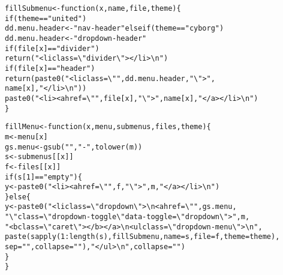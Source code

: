 \documentclass{article}\usepackage[]{graphicx}\usepackage[]{color}
\makeatletter
\newcommand{\hlnum}[1]{\textcolor[rgb]{0.863,0.196,0.184}{#1}}%
\newcommand{\hlstr}[1]{\textcolor[rgb]{0.863,0.196,0.184}{#1}}%
\newcommand{\hlopt}[1]{\textcolor[rgb]{0.576,0.631,0.631}{#1}}%
\newcommand{\hlstd}[1]{\textcolor[rgb]{0.514,0.58,0.588}{#1}}%
\newcommand{\hlkwa}[1]{\textcolor[rgb]{0.796,0.294,0.086}{#1}}%
\newcommand{\hlkwb}[1]{\textcolor[rgb]{0.522,0.6,0}{#1}}%
\newcommand{\hlkwc}[1]{\textcolor[rgb]{0.796,0.294,0.086}{#1}}%
\newcommand{\hlkwd}[1]{\textcolor[rgb]{0.576,0.631,0.631}{#1}}%
\newenvironment{kframe}{%
 \def\at@end@of@kframe{}%
 \ifinner\ifhmode%
  \def\at@end@of@kframe{\end{minipage}}%
  \begin{minipage}{\columnwidth}%
 \fi\fi%
 \def\FrameCommand##1{\hskip\@totalleftmargin \hskip-\fboxsep
 \colorbox{shadecolor}{##1}\hskip-\fboxsep
     \hskip-\linewidth \hskip-\@totalleftmargin \hskip\columnwidth}%
 \MakeFramed {\advance\hsize-\width
   \@totalleftmargin\z@ \linewidth\hsize
   \@setminipage}}%
 {\par\unskip\endMakeFramed%
 \at@end@of@kframe}
\newenvironment{knitrout}{}{} %
\makeatother
\begin{document}
\begin{knitrout}
\begin{kframe}
\begin{alltt}
    \hlstd{fillSubmenu} \hlkwb{<-} \hlkwa{function}\hlstd{(}\hlkwc{x}\hlstd{,} \hlkwc{name}\hlstd{,} \hlkwc{file}\hlstd{,} \hlkwc{theme}\hlstd{) \{}
        \hlkwa{if} \hlstd{(theme} \hlopt{==} \hlstr{"united"}\hlstd{)}
            \hlstd{dd.menu.header} \hlkwb{<-} \hlstr{"nav-header"} \hlkwa{else if} \hlstd{(theme} \hlopt{==} \hlstr{"cyborg"}\hlstd{)}
            \hlstd{dd.menu.header} \hlkwb{<-} \hlstr{"dropdown-header"}
        \hlkwa{if} \hlstd{(file[x]} \hlopt{==} \hlstr{"divider"}\hlstd{)}
            \hlkwd{return}\hlstd{(}\hlstr{"              <li class=\textbackslash{}"divider\textbackslash{}"></li>\textbackslash{}n"}\hlstd{)}
        \hlkwa{if} \hlstd{(file[x]} \hlopt{==} \hlstr{"header"}\hlstd{)}
            \hlkwd{return}\hlstd{(}\hlkwd{paste0}\hlstd{(}\hlstr{"              <li class=\textbackslash{}""}\hlstd{, dd.menu.header,} \hlstr{"\textbackslash{}">"}\hlstd{,}
                \hlstd{name[x],} \hlstr{"</li>\textbackslash{}n"}\hlstd{))}
        \hlkwd{paste0}\hlstd{(}\hlstr{"              <li><a href=\textbackslash{}""}\hlstd{, file[x],} \hlstr{"\textbackslash{}">"}\hlstd{, name[x],} \hlstr{"</a></li>\textbackslash{}n"}\hlstd{)}
    \hlstd{\}}

    \hlstd{fillMenu} \hlkwb{<-} \hlkwa{function}\hlstd{(}\hlkwc{x}\hlstd{,} \hlkwc{menu}\hlstd{,} \hlkwc{submenus}\hlstd{,} \hlkwc{files}\hlstd{,} \hlkwc{theme}\hlstd{) \{}
        \hlstd{m} \hlkwb{<-} \hlstd{menu[x]}
        \hlstd{gs.menu} \hlkwb{<-} \hlkwd{gsub}\hlstd{(}\hlstr{" "}\hlstd{,} \hlstr{"-"}\hlstd{,} \hlkwd{tolower}\hlstd{(m))}
        \hlstd{s} \hlkwb{<-} \hlstd{submenus[[x]]}
        \hlstd{f} \hlkwb{<-} \hlstd{files[[x]]}
        \hlkwa{if} \hlstd{(s[}\hlnum{1}\hlstd{]} \hlopt{==} \hlstr{"empty"}\hlstd{) \{}
            \hlstd{y} \hlkwb{<-} \hlkwd{paste0}\hlstd{(}\hlstr{"<li><a href=\textbackslash{}""}\hlstd{, f,} \hlstr{"\textbackslash{}">"}\hlstd{, m,} \hlstr{"</a></li>\textbackslash{}n"}\hlstd{)}
        \hlstd{\}} \hlkwa{else} \hlstd{\{}
            \hlstd{y} \hlkwb{<-} \hlkwd{paste0}\hlstd{(}\hlstr{"<li class=\textbackslash{}"dropdown\textbackslash{}">\textbackslash{}n            <a href=\textbackslash{}""}\hlstd{, gs.menu,}
                \hlstr{"\textbackslash{}" class=\textbackslash{}"dropdown-toggle\textbackslash{}" data-toggle=\textbackslash{}"dropdown\textbackslash{}">"}\hlstd{, m,}
                \hlstr{" <b class=\textbackslash{}"caret\textbackslash{}"></b></a>\textbackslash{}n            <ul class=\textbackslash{}"dropdown-menu\textbackslash{}">\textbackslash{}n"}\hlstd{,}
                \hlkwd{paste}\hlstd{(}\hlkwd{sapply}\hlstd{(}\hlnum{1}\hlopt{:}\hlkwd{length}\hlstd{(s), fillSubmenu,} \hlkwc{name} \hlstd{= s,} \hlkwc{file} \hlstd{= f,} \hlkwc{theme} \hlstd{= theme),}
                  \hlkwc{sep} \hlstd{=} \hlstr{""}\hlstd{,} \hlkwc{collapse} \hlstd{=} \hlstr{""}\hlstd{),} \hlstr{"            </ul>\textbackslash{}n"}\hlstd{,} \hlkwc{collapse} \hlstd{=} \hlstr{""}\hlstd{)}
        \hlstd{\}}
    \hlstd{\}}


\end{alltt}
\end{kframe}
\end{knitrout}
\end{document}
